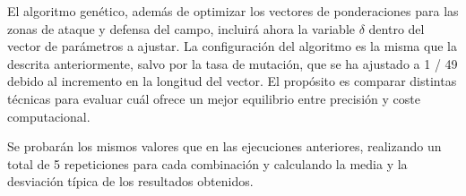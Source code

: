 El algoritmo genético, además de optimizar los vectores de ponderaciones para las zonas de ataque y defensa del campo, incluirá ahora la variable $\delta$ dentro del vector de parámetros a ajustar. La configuración del algoritmo es la misma que la descrita anteriormente, salvo por la tasa de mutación, que se ha ajustado a 1 / 49 debido al incremento en la longitud del vector. El propósito es comparar distintas técnicas para evaluar cuál ofrece un mejor equilibrio entre precisión y coste computacional.

Se probarán los mismos valores que en las ejecuciones anteriores, realizando un total de 5 repeticiones para cada combinación y calculando la media y la desviación típica de los resultados obtenidos.
